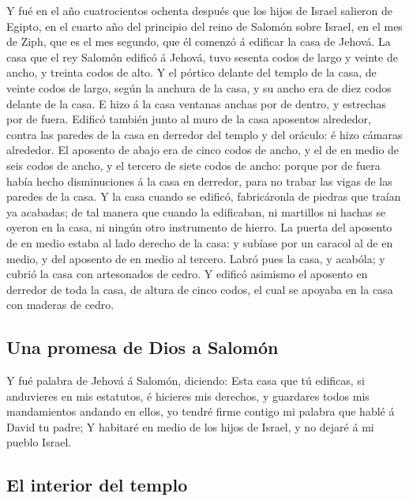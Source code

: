  Y fué en el año cuatrocientos ochenta después que los
hijos de Israel salieron de Egipto, en el cuarto año del principio del
reino de Salomón sobre Israel, en el mes de Ziph, que es el mes segundo,
que él comenzó á edificar la casa de Jehová.  La casa que
el rey Salomón edificó á Jehová, tuvo sesenta codos de largo y veinte de
ancho, y treinta codos de alto.  Y el pórtico delante del
templo de la casa, de veinte codos de largo, según la anchura de la
casa, y su ancho era de diez codos delante de la casa.  E
hizo á la casa ventanas anchas por de dentro, y estrechas por de fuera.
 Edificó también junto al muro de la casa aposentos
alrededor, contra las paredes de la casa en derredor del templo y del
oráculo: é hizo cámaras alrededor.  El aposento de abajo
era de cinco codos de ancho, y el de en medio de seis codos de ancho, y
el tercero de siete codos de ancho: porque por de fuera había hecho
disminuciones á la casa en derredor, para no trabar las vigas de las
paredes de la casa.  Y la casa cuando se edificó,
fabricáronla de piedras que traían ya acabadas; de tal manera que cuando
la edificaban, ni martillos ni hachas se oyeron en la casa, ni ningún
otro instrumento de hierro.  La puerta del aposento de en
medio estaba al lado derecho de la casa: y subíase por un caracol al de
en medio, y del aposento de en medio al tercero.  Labró
pues la casa, y acabóla; y cubrió la casa con artesonados de cedro.
 Y edificó asimismo el aposento en derredor de toda la
casa, de altura de cinco codos, el cual se apoyaba en la casa con
maderas de cedro.

\hypertarget{una-promesa-de-dios-a-salomuxf3n}{%
\subsection{Una promesa de Dios a
Salomón}\label{una-promesa-de-dios-a-salomuxf3n}}

 Y fué palabra de Jehová á Salomón, diciendo:
 Esta casa que tú edificas, si anduvieres en mis
estatutos, é hicieres mis derechos, y guardares todos mis mandamientos
andando en ellos, yo tendré firme contigo mi palabra que hablé á David
tu padre;  Y habitaré en medio de los hijos de Israel, y
no dejaré á mi pueblo Israel.

\hypertarget{el-interior-del-templo}{%
\subsection{El interior del templo}\label{el-interior-del-templo}}

